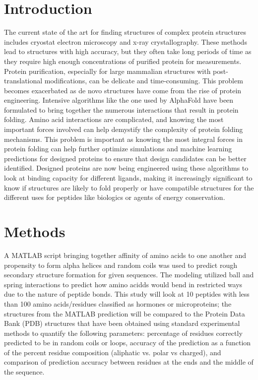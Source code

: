 \documentclass[aps,prl,reprint]{revtex4-2}
\begin{document}
\section{Introduction}
The current state of the art for finding structures of complex protein structures includes cryostat electron microscopy and x-ray crystallography. These methods lead to structures with high accuracy, but they often take long periods of time as they require high enough concentrations of purified protein for measurements. Protein purification, especially for large mammalian structures with post-translational modifications, can be delicate and time-consuming. This problem becomes exacerbated as de novo structures have come from the rise of protein engineering. Intensive algorithms like the one used by AlphaFold have been formulated to bring together the numerous interactions that result in protein folding. Amino acid interactions are complicated, and knowing the most important forces involved can help demystify the complexity of protein folding mechanisms. This problem is important as knowing the most integral forces in protein folding can help further optimize simulations and machine learning predictions for designed proteins to ensure that design candidates can be better identified. Designed proteins are now being engineered using these algorithms to look at binding capacity for different ligands, making it increasingly significant to know if structures are likely to fold properly or have compatible structures for the different uses for peptides like biologics or agents of energy conservation.

\section{Methods}
A MATLAB script bringing together affinity of amino acids to one another and propensity to form alpha helices and random coils was used to predict rough secondary structure formation for given sequences. The modeling utilized ball and spring interactions to predict how amino acidds would bend in restricted ways due to the nature of peptide bonds. This study will look at 10 peptides with less than 100 amino acids/residues classified as hormones or microproteins; the structures from the MATLAB prediction will be compared to the Protein Data Bank (PDB) structures that have been obtained using standard experimental methods to quantify the following parameters: percentage of residues correctly predicted to be in random coils or loops, accuracy of the prediction as a function of the percent residue composition (aliphatic vs. polar vs charged), and comparison of prediction accuracy between residues at the ends and the middle of the sequence.
\end{document}
